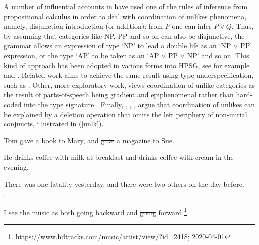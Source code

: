 \documentclass[output=paper
                ,modfonts
                ,nonflat
	        ,collection
	        ,collectionchapter
	        ,collectiontoclongg
 	        ,biblatex
                ,babelshorthands
                ,newtxmath
                ,draftmode
                ,colorlinks, citecolor=brown
]{./langsci/langscibook}
\begin{document}
{\begin{exe}
\ex
\begin{xlista}
\end{xlista}\label{show2}
\end{exe}



A number of influential accounts in 
\citep{morrill90,morrill94,bayer}\addpages have used one of the rules of
inference from propositional calculus in order to deal with
coordination of unlikes phenomena, namely, disjunction introduction
(or addition): from $P$ one can infer $P \vee Q$. 
Thus, by assuming that categories like NP, PP
and so on can also be disjunctive, the grammar allows an expression
of type `NP' to lead a double life as an `NP $\vee$ PP' expression,
or the type `AP' to be taken as an `AP $\vee$ PP $\vee$ NP' and so
on. This kind of approach has been adopted in various forms into HPSG, see for example \citet{Daniels02} and  \citet{Yatabe:04}.
Related work aims to achieve the same result using type-underspecification, such as 
 \citet{Sag:03}. Other, more exploratory work, views coordination of unlike categories as the result of   parts-of-speech being gradient and  epiphenomenal rather than hard-coded into the type signature  \citep{bookivan}.
 Finally,  
 \citet{berthold0}, \citet{yatabe},  \citet{Beavers},
 \citet{chaves06}  argue that
coordination of unlikes can be explained by
a deletion operation that omits the left periphery of
non-initial conjuncts, illustrated in   (\ref{unlk}).


\begin{exe}
\ex
\begin{xlista}
\ex Tom gave a book to Mary, and \sout{gave} a magazine to Sue. 

\ex He drinks coffee with milk at breakfast and \sout{drinks coffee with} cream in the evening.\\ \citep[]{hudson84}

\ex There was one fatality yesterday, and \sout{there were} two others on the day
before.\\
\citep[339]{chavesthesis}.

\ex I see the music as both going backward and \sout{going} forward.\footnote{
\url{https://www.hdtracks.com/music/artist/view/?id=2418}; 2020-04-01}
\end{xlista}\label{unlk}
\end{exe}

}
\end{document}
